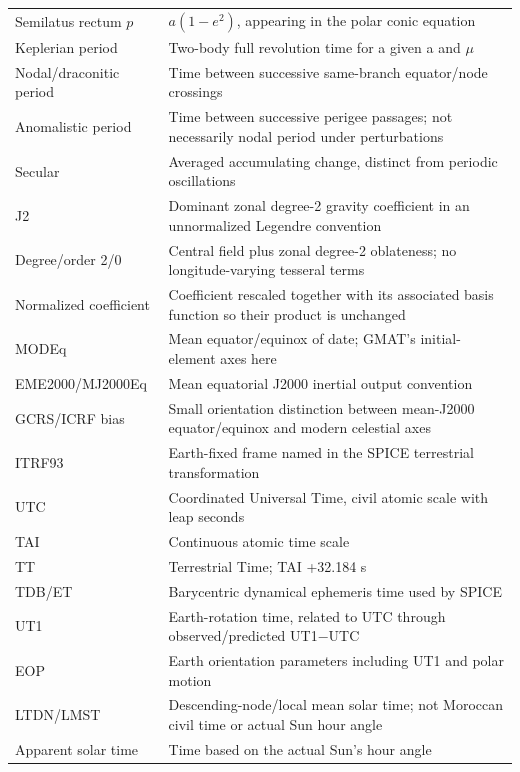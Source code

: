 \documentclass[10pt,a4paper]{article}
\numberwithin{equation}{section}
\begin{document}
\begin{longtable}{@{}>{\raggedright\arraybackslash}p{}>{\raggedright\arraybackslash}p{}@{}}
\rowcolor{rowalt}Semilatus rectum \(p\) & \(a(1-e^2)\), appearing in the polar conic equation \\
Keplerian period & Two-body full revolution time for a given a and \(\mu\) \\
\rowcolor{rowalt}Nodal/draconitic period & Time between successive same-branch equator/node crossings \\
Anomalistic period & Time between successive perigee passages; not necessarily nodal period under perturbations \\
\rowcolor{rowalt}Secular & Averaged accumulating change, distinct from periodic oscillations \\
J2 & Dominant zonal degree-2 gravity coefficient in an unnormalized Legendre convention \\
\rowcolor{rowalt}Degree/order 2/0 & Central field plus zonal degree-2 oblateness; no longitude-varying tesseral terms \\
Normalized coefficient & Coefficient rescaled together with its associated basis function so their product is unchanged \\
\rowcolor{rowalt}MODEq & Mean equator/equinox of date; GMAT's initial-element axes here \\
EME2000/MJ2000Eq & Mean equatorial J2000 inertial output convention \\
\rowcolor{rowalt}GCRS/ICRF bias & Small orientation distinction between mean-J2000 equator/equinox and modern celestial axes \\
ITRF93 & Earth-fixed frame named in the SPICE terrestrial transformation \\
\rowcolor{rowalt}UTC & Coordinated Universal Time, civil atomic scale with leap seconds \\
TAI & Continuous atomic time scale \\
\rowcolor{rowalt}TT & Terrestrial Time; TAI +32.184 s \\
TDB/ET & Barycentric dynamical ephemeris time used by SPICE \\
\rowcolor{rowalt}UT1 & Earth-rotation time, related to UTC through observed/predicted UT1\ensuremath{-}UTC \\
EOP & Earth orientation parameters including UT1 and polar motion \\
\rowcolor{rowalt}LTDN/LMST & Descending-node/local mean solar time; not Moroccan civil time or actual Sun hour angle \\
Apparent solar time & Time based on the actual Sun's hour angle \\

\end{longtable}
\end{document}
